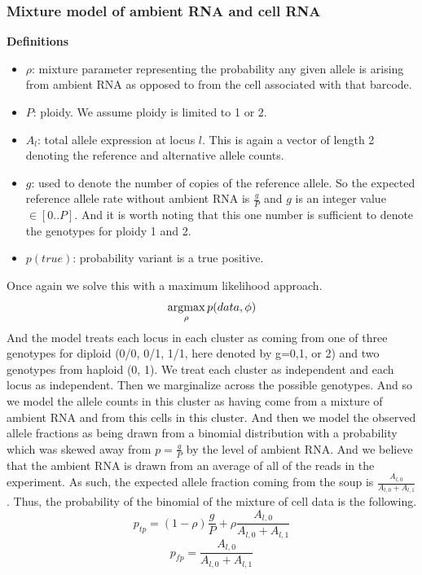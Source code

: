 \subsubsection{Mixture model of ambient RNA and cell RNA}

\noindent
\textbf{Definitions}
\begin{itemize}
\item $\rho$: mixture parameter representing the probability any given allele is arising from ambient RNA as opposed to from the cell associated with that barcode.
\item $P$: ploidy. We assume ploidy is limited to 1 or 2.
\item $A_l$: total allele expression at locus $l$. This is again a vector of length 2 denoting the reference and alternative allele counts.
\item $g$: used to denote the number of copies of the reference allele. So the expected reference allele rate without ambient RNA is $\frac{g}{P}$ and $g$ is an integer value $\in [0..P]$. And it is worth noting that this one number is sufficient to denote the genotypes for ploidy 1 and 2.
\item $p(true)$: probability variant is a true positive. 
\end{itemize}

Once again we solve this with a maximum likelihood approach.
\begin{equation}
\operatorname*{argmax}_{\rho} p(data, \phi)
\end{equation}
And the model treats each locus in each cluster as coming from one of three genotypes for diploid (0/0, 0/1, 1/1, here denoted by g=0,1, or 2) and two genotypes from haploid (0, 1). We 
treat each cluster as independent and each locus as independent. Then we marginalize across the possible genotypes.  
And so we model the allele counts in this cluster as having come from 
a mixture of ambient RNA and from this cells in this cluster. And then we model the observed allele fractions as being drawn from a binomial distribution 
with a probability which was skewed away from $p=\frac{g}{P}$ by the level of ambient RNA. And we believe that the ambient RNA is drawn from 
an average of all of the reads in the experiment. As such, the expected allele fraction coming from the soup is $\frac{A_{l,0}}{A_{l,0} + A_{l,1}}$. 
Thus, the probability of the binomial of the mixture of cell data is the following.
\begin{equation}
p_{tp} = (1-\rho)\frac{g}{P} + \rho \frac{A_{l,0}}{A_{l,0}+A_{l,1}}
\end{equation}
\begin{equation}
p_{fp} = \frac{A_{l,0}}{A_{l,0}+A_{l,1}}
\end{equation}



